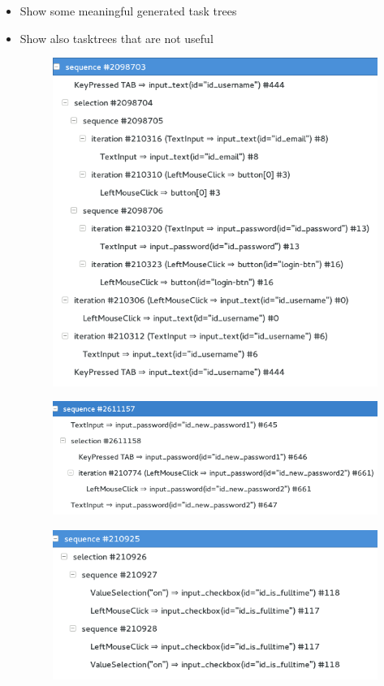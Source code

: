 \begin{itemize}
	\item Show some meaningful generated task trees
	\item Show also tasktrees that are not useful
\begin{figure}
	\centering
	\includegraphics[]{chapters/casestudy/mixedtasktree.png}
	\caption{}
	\label{}
\end{figure}
\begin{figure}
	\centering
	\includegraphics[]{chapters/casestudy/newpassword.png}
	\caption{}
	\label{}
\end{figure}
\begin{figure}
	\centering
	\includegraphics[]{chapters/casestudy/preprocessing_needed.png}

\end{figure}
\end{itemize}
